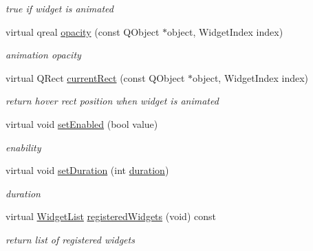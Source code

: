 \begin{DoxyCompactItemize}
\begin{DoxyCompactList}\small\item\em true if widget is animated \end{DoxyCompactList}\item 
\mbox{\label{class_menu_engine_v1_ad7723dcceed209d7e0853b5034d18d7d}} 
virtual qreal \hyperlink{class_menu_engine_v1_ad7723dcceed209d7e0853b5034d18d7d}{opacity} (const Q\+Object $\ast$object, Widget\+Index index)
\begin{DoxyCompactList}\small\item\em animation opacity \end{DoxyCompactList}\item 
\mbox{\label{class_menu_engine_v1_ab1af3af602c48cf85e4d9154aff86fcc}} 
virtual Q\+Rect \hyperlink{class_menu_engine_v1_ab1af3af602c48cf85e4d9154aff86fcc}{current\+Rect} (const Q\+Object $\ast$object, Widget\+Index index)
\begin{DoxyCompactList}\small\item\em return \textquotesingle{}hover\textquotesingle{} rect position when widget is animated \end{DoxyCompactList}\item 
\mbox{\label{class_menu_engine_v1_aad7de6e4bbdf69dc9694a122bcd711d2}} 
virtual void \hyperlink{class_menu_engine_v1_aad7de6e4bbdf69dc9694a122bcd711d2}{set\+Enabled} (bool value)
\begin{DoxyCompactList}\small\item\em enability \end{DoxyCompactList}\item 
\mbox{\label{class_menu_engine_v1_ac7985c3f4b697d7213bbff7bdfcd00c7}} 
virtual void \hyperlink{class_menu_engine_v1_ac7985c3f4b697d7213bbff7bdfcd00c7}{set\+Duration} (int \hyperlink{class_base_engine_a7edb8da9d2fd6cca19682d1d089dfa4b}{duration})
\begin{DoxyCompactList}\small\item\em duration \end{DoxyCompactList}\item 
\mbox{\label{class_menu_engine_v1_a8d949dd3e9e291f7680e021807525b16}} 
virtual \hyperlink{class_base_engine_a2b0faec98a7eb68c91b502459c46a9c7}{Widget\+List} \hyperlink{class_menu_engine_v1_a8d949dd3e9e291f7680e021807525b16}{registered\+Widgets} (void) const
\begin{DoxyCompactList}\small\item\em return list of registered widgets \end{DoxyCompactList}\end{DoxyCompactItemize}
